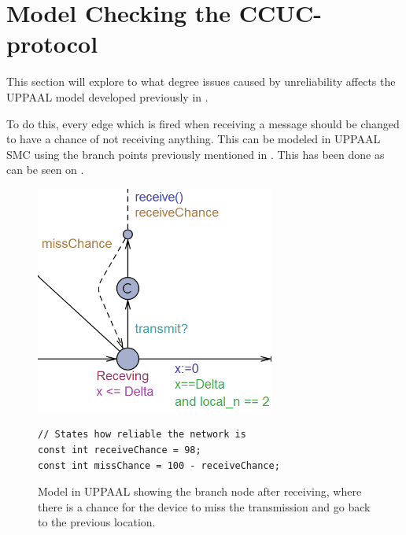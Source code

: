 \section{Model Checking the CCUC-protocol}\label{sec:uppaalccuc}
This section will explore to what degree issues caused by unreliability affects the UPPAAL model developed previously in .

To do this, every edge which is fired when receiving a message should be changed to have a chance of not receiving anything. 
This can be modeled in UPPAAL SMC using the branch points previously mentioned in .
This has been done as can be seen on .

\begin{figure}[h]
\vspace{-5pt} 
\begin{minipage}{.48\textwidth}
\centering
\includegraphics[width=0.7\textwidth]{Figures/Model/MissChance_2.PNG}
\vspace{-10pt} 
\caption{Model in UPPAAL showing the branch node after receiving, where there is a chance for the device to miss the transmission and go back to the previous location.}
\label{fig:missTransmission}
\end{minipage} \hfill
\begin{minipage}{.45\textwidth}
\vspace{82pt}
\begin{lstlisting}[style=UPPAAL, caption={Specifying the reliability of the transmissions, the current numbers result in a 2 \% miss chance.}, label={unreliability-UPPAAL}]
// States how reliable the network is
const int receiveChance = 98;
const int missChance = 100 - receiveChance;
\end{lstlisting}
\end{minipage}
\end{figure} 

